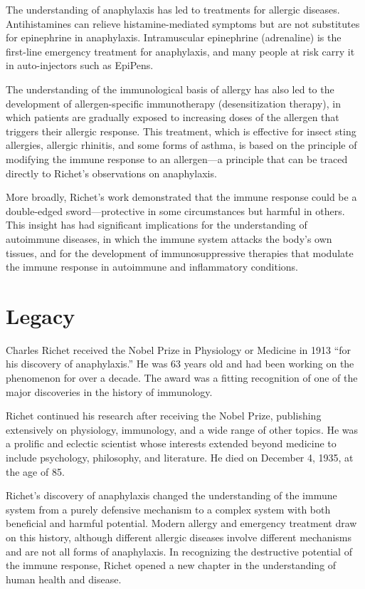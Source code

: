 The understanding of anaphylaxis has led to treatments for allergic diseases. Antihistamines can relieve histamine-mediated symptoms but are not substitutes for epinephrine in anaphylaxis. Intramuscular epinephrine (adrenaline) is the first-line emergency treatment for anaphylaxis, and many people at risk carry it in auto-injectors such as EpiPens.

The understanding of the immunological basis of allergy has also led to the development of allergen-specific immunotherapy (desensitization therapy), in which patients are gradually exposed to increasing doses of the allergen that triggers their allergic response. This treatment, which is effective for insect sting allergies, allergic rhinitis, and some forms of asthma, is based on the principle of modifying the immune response to an allergen---a principle that can be traced directly to Richet's observations on anaphylaxis.

More broadly, Richet's work demonstrated that the immune response could be a double-edged sword---protective in some circumstances but harmful in others. This insight has had significant implications for the understanding of autoimmune diseases, in which the immune system attacks the body's own tissues, and for the development of immunosuppressive therapies that modulate the immune response in autoimmune and inflammatory conditions.

\section{Legacy}

Charles Richet received the Nobel Prize in Physiology or Medicine in 1913 ``for his discovery of anaphylaxis.'' He was 63 years old and had been working on the phenomenon for over a decade. The award was a fitting recognition of one of the major discoveries in the history of immunology.

Richet continued his research after receiving the Nobel Prize, publishing extensively on physiology, immunology, and a wide range of other topics. He was a prolific and eclectic scientist whose interests extended beyond medicine to include psychology, philosophy, and literature. He died on December 4, 1935, at the age of 85.

Richet's discovery of anaphylaxis changed the understanding of the immune system from a purely defensive mechanism to a complex system with both beneficial and harmful potential. Modern allergy and emergency treatment draw on this history, although different allergic diseases involve different mechanisms and are not all forms of anaphylaxis. In recognizing the destructive potential of the immune response, Richet opened a new chapter in the understanding of human health and disease.


